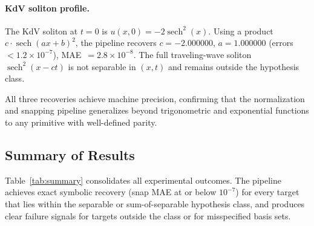 \paragraph{KdV soliton profile.}
The KdV soliton at $t=0$ is $u(x,0) = -2\operatorname{sech}^{2}(x)$.
Using a product $c \cdot \operatorname{sech}(ax+b)^{2}$, the pipeline
recovers $c = -2.000000$, $a = 1.000000$ (errors $< 1.2\!\times\!10^{-7}$),
MAE~$= 2.8\!\times\!10^{-8}$.  The full traveling-wave soliton
$\operatorname{sech}^{2}(x - ct)$ is not separable in $(x,t)$ and remains
outside the hypothesis class.

All three recoveries achieve machine precision, confirming that the
normalization and snapping pipeline generalizes beyond trigonometric and
exponential functions to any primitive with well-defined parity.


\subsection{Summary of Results}
\label{sec:summary_table}

Table~\ref{tab:summary} consolidates all experimental outcomes.  The pipeline
achieves exact symbolic recovery (snap MAE at or below $10^{-7}$) for every
target that lies within the separable or sum-of-separable hypothesis class, and
produces clear failure signals for targets outside the class or for
misspecified basis sets.

